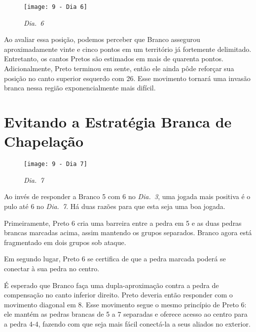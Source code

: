 \begin{wrapfigure}{l}{60mm}
    \vspace{-22.5pt}
    \begin{center}
        \texttt{[image: 9 - Dia 6]}
        \captionsetup{justification=centering}
        \caption*{\emph{Dia.\@~6}}
    \end{center}
    \vspace{-30pt}
\end{wrapfigure}

Ao avaliar essa posição, podemos perceber que Branco assegurou aproximadamente vinte e cinco pontos em um território já fortemente delimitado. Entretanto, os cantos Pretos são estimados em mais de quarenta pontos. Adicionalmente, Preto terminou em sente, então ele ainda pôde reforçar sua posição no canto superior esquerdo com 26. Esse movimento tornará uma invasão branca nessa região exponencialmente mais difícil.

\pagebreak

\section{Evitando a Estratégia Branca de Chapelação}

\begin{wrapfigure}{r}{60mm}
    \vspace{-27.5pt}
    \begin{center}
        \texttt{[image: 9 - Dia 7]}
        \captionsetup{justification=centering}
        \caption*{\emph{Dia.\@~7}}
    \end{center}
    \vspace{-37.5pt}
\end{wrapfigure}

Ao invés de responder a Branco 5 com 6 no \emph{Dia.\@~3}, uma jogada mais positiva é o pulo até 6 no \emph{Dia.\@~7}. Há duas razões para que esta seja uma boa jogada.

Primeiramente, Preto 6 cria uma barreira entre a pedra em 5 e as duas pedras brancas marcadas acima, assim mantendo os grupos separados. Branco agora está fragmentado em dois grupos sob ataque.

Em segundo lugar, Preto 6 se certifica de que a pedra marcada poderá se conectar à sua pedra no centro.

É esperado que Branco faça uma dupla-aproximação contra a pedra de compensação no canto inferior direito. Preto deveria então responder com o movimento diagonal em 8. Esse movimento segue o mesmo princípio de Preto 6: ele mantém as pedras brancas de 5 a 7 separadas e oferece acesso ao centro para a pedra 4-4, fazendo com que seja mais fácil conectá-la a seus aliados no exterior.

